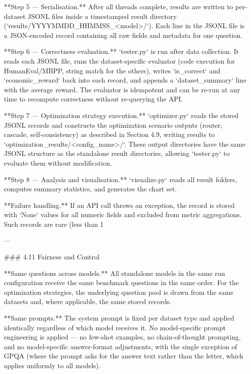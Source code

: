 **Step 5 — Serialisation.** After all threads complete, results are written to per-dataset JSONL files inside a timestamped result directory (`results/YYYYMMDD_HHMMSS_<model>/`). Each line in the JSONL file is a JSON-encoded record containing all raw fields and metadata for one question.

**Step 6 — Correctness evaluation.** `tester.py` is run after data collection. It reads each JSONL file, runs the dataset-specific evaluator (code execution for HumanEval/MBPP, string match for the others), writes `is_correct` and `economic_reward` back into each record, and appends a `dataset_summary` line with the average reward. The evaluator is idempotent and can be re-run at any time to recompute correctness without re-querying the API.

**Step 7 — Optimization strategy execution.** `optimizer.py` reads the stored JSONL records and constructs the optimization scenario outputs (router, cascade, self-consistency) as described in Section 4.9, writing results to `optimization_results/<config_name>/`. These output directories have the same JSONL structure as the standalone result directories, allowing `tester.py` to evaluate them without modification.

**Step 8 — Analysis and visualisation.** `visualize.py` reads all result folders, computes summary statistics, and generates the chart set.

**Failure handling.** If an API call throws an exception, the record is stored with `None` values for all numeric fields and excluded from metric aggregations. Such records are rare (less than 1%

---

### 4.11 Fairness and Control

**Same questions across models.** All standalone models in the same run configuration receive the same benchmark questions in the same order. For the optimization strategies, the underlying question pool is drawn from the same datasets and, where applicable, the same stored records.

**Same prompts.** The system prompt is fixed per dataset type and applied identically regardless of which model receives it. No model-specific prompt engineering is applied — no few-shot examples, no chain-of-thought prompting, and no model-specific answer-format adjustments, with the single exception of GPQA (where the prompt asks for the answer text rather than the letter, which applies uniformly to all models).

